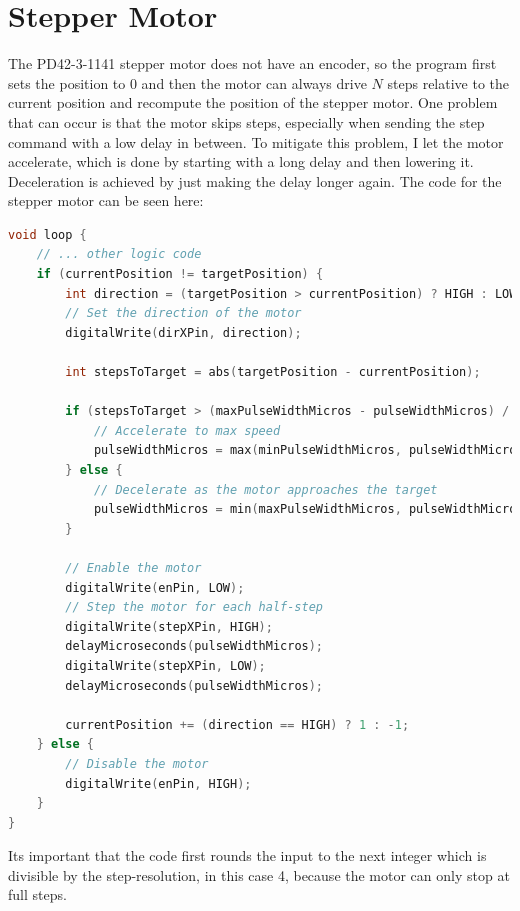\section{Stepper Motor}\label{sec:stepper-motor}
The PD42-3-1141 stepper motor does not have an encoder, so the program first sets the position to $0$ and then the motor can always drive $N$ steps relative to the current position and recompute the position of the stepper motor.
One problem that can occur is that the motor skips steps, especially when sending the step command with a low delay in between.
To mitigate this problem, I let the motor accelerate, which is done by starting with a long delay and then lowering it.
Deceleration is achieved by just making the delay longer again.
The code for the stepper motor can be seen here:
\begin{lstlisting}[language=cpp,breaklines,label={lst:stepper-motor}]
void loop {
    // ... other logic code
    if (currentPosition != targetPosition) {
        int direction = (targetPosition > currentPosition) ? HIGH : LOW;
        // Set the direction of the motor
        digitalWrite(dirXPin, direction);

        int stepsToTarget = abs(targetPosition - currentPosition);

        if (stepsToTarget > (maxPulseWidthMicros - pulseWidthMicros) / acc) {
            // Accelerate to max speed
            pulseWidthMicros = max(minPulseWidthMicros, pulseWidthMicros - acc);
        } else {
            // Decelerate as the motor approaches the target
            pulseWidthMicros = min(maxPulseWidthMicros, pulseWidthMicros + acc);
        }

        // Enable the motor
        digitalWrite(enPin, LOW);
        // Step the motor for each half-step
        digitalWrite(stepXPin, HIGH);
        delayMicroseconds(pulseWidthMicros);
        digitalWrite(stepXPin, LOW);
        delayMicroseconds(pulseWidthMicros);

        currentPosition += (direction == HIGH) ? 1 : -1;
    } else {
        // Disable the motor
        digitalWrite(enPin, HIGH);
    }
}
\end{lstlisting}
Its important that the code first rounds the input to the next integer which is divisible by the step-resolution, in this case 4, because the motor can only stop at full steps.\\
\vspace{0.5cm}\\
